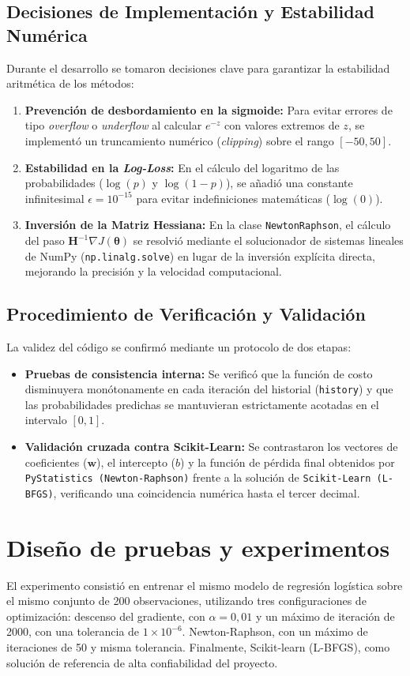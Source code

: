 \subsection{Decisiones de Implementación y Estabilidad Numérica}
Durante el desarrollo se tomaron decisiones clave para garantizar la estabilidad aritmética de los métodos:
\begin{enumerate}
    \item \textbf{Prevención de desbordamiento en la sigmoide:} Para evitar errores de tipo \textit{overflow} o \textit{underflow} al calcular $e^{-z}$ con valores extremos de $z$, se implementó un truncamiento numérico (\textit{clipping}) sobre el rango $[-50, 50]$.
    \item \textbf{Estabilidad en la \textit{Log-Loss}:} En el cálculo del logaritmo de las probabilidades ($\log(p)$ y $\log(1-p)$), se añadió una constante infinitesimal $\epsilon = 10^{-15}$ para evitar indefiniciones matemáticas ($\log(0)$).
    \item \textbf{Inversión de la Matriz Hessiana:} En la clase \texttt{NewtonRaphson}, el cálculo del paso $\mathbf{H}^{-1} \nabla J(\boldsymbol{\theta})$ se resolvió mediante el solucionador de sistemas lineales de NumPy (\texttt{np.linalg.solve}) en lugar de la inversión explícita directa, mejorando la precisión y la velocidad computacional.
\end{enumerate}

\subsection{Procedimiento de Verificación y Validación}
La validez del código se confirmó mediante un protocolo de dos etapas:
\begin{itemize}
    \item \textbf{Pruebas de consistencia interna:} Se verificó que la función de costo disminuyera monótonamente en cada iteración del historial (\texttt{history}) y que las probabilidades predichas se mantuvieran estrictamente acotadas en el intervalo $[0, 1]$.
    \item \textbf{Validación cruzada contra Scikit-Learn:} Se contrastaron los vectores de coeficientes ($\boldsymbol{w}$), el intercepto ($b$) y la función de pérdida final obtenidos por \texttt{PyStatistics (Newton-Raphson)} frente a la solución de \texttt{Scikit-Learn (L-BFGS)}, verificando una coincidencia numérica hasta el tercer decimal.
\end{itemize}

\section{Diseño de pruebas y experimentos}
El experimento consistió en entrenar el mismo modelo de regresión logística sobre el mismo conjunto de 200 observaciones, utilizando tres configuraciones de optimización: descenso del gradiente, con $\alpha = 0,01$ y un máximo de iteración de 2000, con una tolerancia de $1 \times 10^{-6}$. Newton-Raphson, con un máximo de iteraciones de 50 y misma tolerancia. Finalmente, Scikit-learn (L-BFGS), como solución de referencia de alta confiabilidad del proyecto.

